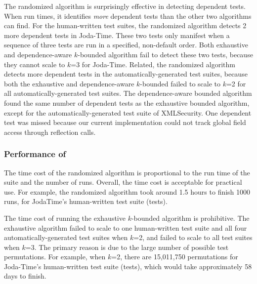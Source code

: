 


The randomized algorithm is surprisingly effective in
detecting dependent tests. When run \trialnum times,
it identifies \textit{more} dependent tests than the other
two algorithms can find. For the human-written
test suites, the randomized algorithm detects 2 more dependent
tests in Joda-Time. These two tests only
manifest when a sequence of three tests are run in a specified,
non-default order. Both exhaustive and dependence-aware $k$-bounded
algorithm fail to detect these two tests, because
they cannot scale to $k$=3 for 
Joda-Time. Related, the randomized algorithm
detects more dependent
tests in the automatically-generated test suites,
because both the exhaustive and dependence-aware $k$-bounded
failed to scale to $k$=2 for all automatically-generated test suites.
The dependence-aware bounded algorithm found the same
number of dependent tests as the exhaustive bounded algorithm, except
for the automatically-generated test suite of XMLSecurity.
One dependent test was missed because
our current implementation could not track global field access
through reflection calls.



\subsubsection{Performance of \ourtool}
\label{sec:performance}

The time cost of the randomized algorithm 
is proportional to the run time of the suite and the number of runs.
Overall, the time cost is acceptable for practical use.
For example, the randomized algorithm took around 1.5 hours
to finish 1000 runs,  for JodaTime's human-written test
suite (\jodatimetests tests).
 
The time cost of running the exhaustive $k$-bounded algorithm
is prohibitive. The exhaustive algorithm failed to
scale to one human-written test suite and all four automatically-generated
test suites when $k$=2, and failed to scale to all test suites
when $k$=3. The primary reason is due to the large
number of possible test permutations. 
For example, when $k$=2, there are 15,011,750 permutations
for Joda-Time's human-written test suite (\jodatimetests tests),
which would take approximately 58 days to finish.

